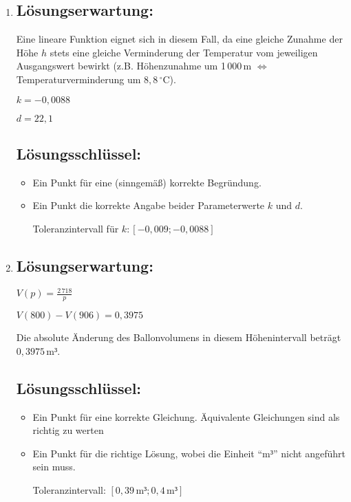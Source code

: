 \begin{langesbeispiel}
{\begin{enumerate}
\begin{itemize}
		Toleranzintervall: $[-0,12; -0,115]$ bzw. $[-12\,\%;-11,5\,\%]$ 
		\item Ein Punkt für eine (sinngemäß) korrekte Begründung.
	\end{itemize}
	
	\item \subsection{Lösungserwartung:}
			
	Eine lineare Funktion eignet sich in diesem Fall, da eine gleiche Zunahme der Höhe $h$ stets eine gleiche Verminderung der Temperatur vom jeweiligen Ausgangswert bewirkt (z.B. Höhenzunahme um 1\,000\,m $\Leftrightarrow$ Temperaturverminderung um $8,8\,^\circ$C). 
	
	$k=-0,0088$ 
	
	$d=22,1$

	\subsection{Lösungsschlüssel:}
	
\begin{itemize}
	\item Ein Punkt für eine (sinngemäß) korrekte Begründung.
	\item   Ein Punkt die korrekte Angabe beider Parameterwerte $k$ und $d$. 
	
	Toleranzintervall für $k: [-0,009; -0,0088]$
\end{itemize}

\item \subsection{Lösungserwartung:}
			
	$V(p)=\frac{2\,718}{p}$
	
	$V(800)-V(906)=0,3975$
	
	Die absolute Änderung des Ballonvolumens in diesem Höhenintervall beträgt $0,3975\,$m$³$.
	\subsection{Lösungsschlüssel:}
	
\begin{itemize}
	\item Ein Punkt für eine korrekte Gleichung. Äquivalente Gleichungen sind als richtig zu werten
	\item Ein Punkt für die richtige Lösung, wobei die Einheit "`m$³$"' nicht angeführt sein muss.  
	
	Toleranzintervall: $[0,39\,\text{m}³; 0,4\,\text{m}³]$
\end{itemize}

\end{enumerate}}
		\end{langesbeispiel}